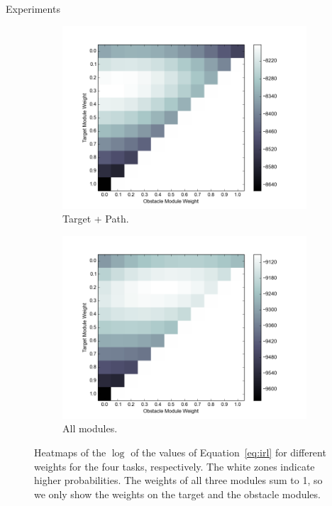 \documentclass[final]{beamer}
\begin{document}
\begin{frame}{}
\begin{textblock}{37}
\begin{block}{Experiments}
\begin{figure}[h]
\begin{subfigure}[b]{0.24\textwidth}
\includegraphics[width=\textwidth]{objValuesTask3.png}
\caption{Target + Path. }
\end{subfigure}
\begin{subfigure}[b]{0.24\textwidth}
\includegraphics[width=\textwidth]{objValuesTask4.png}
\caption{All modules. }
\end{subfigure}
\caption{Heatmaps of the $\log$ of the values of Equation~\ref{eq:irl} for
different weights for the four tasks, respectively. The white zones indicate
higher probabilities. The weights of all three modules sum to 1, so we only show
the weights on the target and the obstacle modules.
}
\label{fig:heatmap}
\end{figure}
\end{block}


\end{textblock}
\end{frame}
\end{document}
